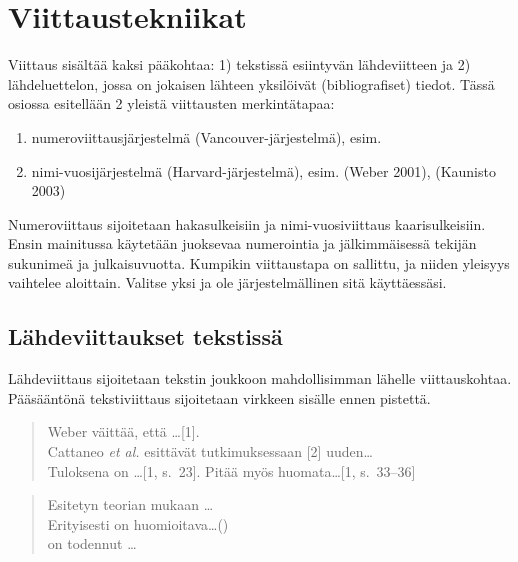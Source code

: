 \documentclass[globalnumbering,centeredcaptions]{tutthesis/tutthesis} %
\newif\ifnameyear
\begin{document}
\chapter{Viittaustekniikat}
\label{ch:viittaustekniikat}

Viittaus sisältää kaksi pääkohtaa: 1) tekstissä esiintyvän lähdeviitteen ja 2) lähdeluettelon, jossa on jokaisen lähteen yksilöivät (bibliografiset) tiedot.
Tässä osiossa esitellään 2 yleistä viittausten merkintätapaa:
\begin{enumerate}
\ifnameyear
  \item numeroviittausjärjestelmä (Vancouver-järjestelmä), esim. [1], [2]\ldots
  \item nimi-vuosijärjestelmä (Harvard-järjestelmä), esim. \citep{Weber2001}, \citep{Kaunisto2003}
\else
  \item numeroviittausjärjestelmä (Vancouver-järjestelmä), esim. \cite{Weber2001}\cite{Kaunisto2003}
  \item nimi-vuosijärjestelmä (Harvard-järjestelmä), esim. (Weber 2001), (Kaunisto 2003)
\fi
\end{enumerate}

Numeroviittaus sijoitetaan hakasulkeisiin ja nimi-vuosiviittaus kaarisulkeisiin.
Ensin mainitussa käytetään juoksevaa numerointia ja jälkimmäisessä tekijän sukunimeä ja julkaisuvuotta.
Kumpikin viittaustapa on sallittu, ja niiden yleisyys vaihtelee aloittain.
Valitse yksi ja ole järjestelmällinen sitä käyttäessäsi.


\section{Lähdeviittaukset tekstissä}

Lähdeviittaus sijoitetaan tekstin joukkoon mahdollisimman lähelle viittauskohtaa.
Pääsääntönä tekstiviittaus sijoitetaan virkkeen sisälle ennen pistettä.

\ifnameyear
  \begin{quotation}
  Weber väittää, että \ldots [1].\\
  Cattaneo \emph{et al.} esittävät tutkimuksessaan [2] uuden\ldots\\
  Tuloksena on \ldots [1, s.~23]. Pitää myös huomata\ldots [1, s.~33--36]
  \end{quotation}

  \begin{quotation}
  Esitetyn teorian mukaan \ldots \citep{Weber2001}\\
  Erityisesti on huomioitava\ldots (\citeauthor{Cattaneo2004})\\
  \citet[s.~230]{Weber2001} on todennut \ldots
  \end{quotation}
    
\end{document}
